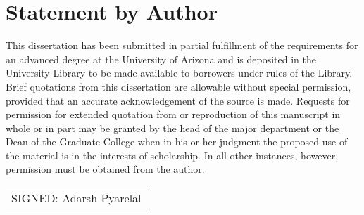 \cleardoublepage
\chapter*{Statement by Author}
\thispagestyle{empty}
This dissertation has been submitted in partial fulfillment of the requirements for an advanced degree at the University of Arizona and is deposited in the University Library to be made available to borrowers under rules of the Library. Brief quotations from this dissertation are allowable without special permission, provided that an accurate acknowledgement of the source is made.  Requests for permission for extended quotation from or reproduction of this manuscript in whole or in part may be granted by the head of the major department or the Dean of the Graduate College when in his or her judgment the proposed use of the material is in the interests of scholarship.  In all other instances, however, permission must be obtained from the author. 
\bigskip
 
\smallskip

\begin{flushright}
    \begin{tabular}{m{5cm}}
        \\ \hline
        \centering SIGNED: Adarsh Pyarelal\\
    \end{tabular}
\end{flushright}
